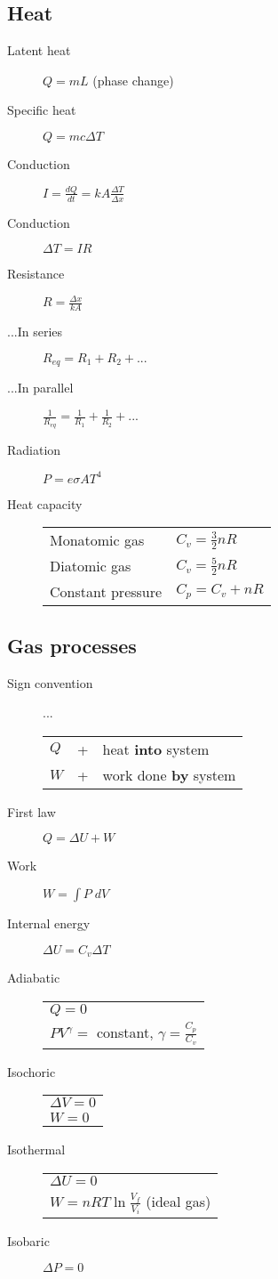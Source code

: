 \documentclass{article}
\newcommand{\bd}{\begin{description}}
\newcommand{\ed}{\end{description}}
\newcommand{\deriv}[2]{\frac{d #1}{d #2}}
\begin{document}
\subsection{Heat}
\bd
	\item[Latent heat] $ Q = m L $ (phase change)
	\item[Specific heat] $ Q = mc\Delta T $
	\item[Conduction] $I = \deriv{Q}{t} = kA\frac{\Delta T}{\Delta x} $
	\item[Conduction] $ \Delta T = I R $
	\item[Resistance] $ R = \frac{\Delta x}{kA} $
	\item[...In series] $ R_{eq} = R_1 + R_2 + ... $
	\item[...In parallel] $\frac{1}{R_{eq}} = \frac{1}{R_1} + \frac{1}{R_2} + ...$
	\item[Radiation] $ P = e \sigma A T^4 $
	\item[Heat capacity]
		\begin{tabular}{ll}
			Monatomic gas & $ C_v = \frac{3}{2} nR $ \\
			Diatomic gas & $ C_v = \frac{5}{2} nR $ \\
			Constant pressure & $C_p = C_v + nR $
		\end{tabular}
\ed

\subsection{Gas processes}
\bd
	\item[Sign convention] ...\newline
		\begin{tabular}{lll}
			$Q$ & + & heat {\bf into} system \\
			$W$ & + & work done {\bf by} system \\
		\end{tabular}
	\item[First law] $ Q = \Delta U + W $
	\item[Work] $ W = \int P\; dV $
	\item[Internal energy] $ \Delta U = C_v \Delta T $
	\item[Adiabatic]
		\begin{tabular}{l}
			$ Q = 0 $ \\
			$ PV^\gamma = $ constant, $ \gamma = \frac{C_p}{C_v} $ 
		\end{tabular}
	\item[Isochoric] 
		\begin{tabular}{l}
		  $ \Delta V = 0 $ \\
			$ W = 0 $
		\end{tabular}
	\item[Isothermal]
		\begin{tabular}{l}
			$ \Delta U = 0 $ \\
			$ W = nRT \ln \frac{V_f}{V_i} $ (ideal gas)
		\end{tabular}
	\item[Isobaric] $ \Delta P = 0 $
\ed
\end{document}
